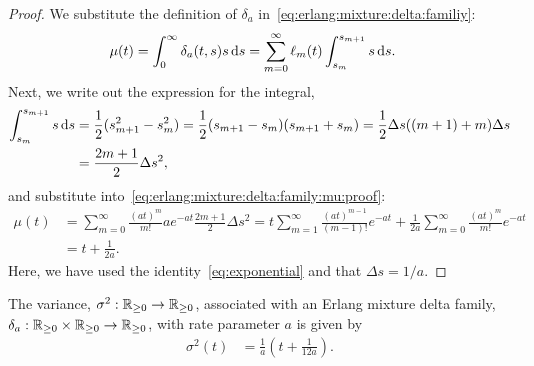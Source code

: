 \begin{proof}
	We substitute the definition of $\delta_a$ in~\eqref{eq:erlang:mixture:delta:familiy}:
	\begin{align}\label{eq:erlang:mixture:delta:family:mu:proof}
		\mu(t)
		&= \int_0^\infty \delta_a(t, s) s \,\mathrm{d} s = \sum_{m=0}^\infty \ell_m(t) \int_{s_m}^{s_{m+1}} s \,\mathrm{d} s.
	\end{align}
	Next, we write out the expression for the integral,
	\begin{align}
		\int_{s_m}^{s_{m+1}} s \,\mathrm{d} s
		&= \frac{1}{2} (s_{m+1}^2 - s_m^2) = \frac{1}{2} (s_{m+1} - s_m)(s_{m+1} + s_m) = \frac{1}{2} \Delta s ((m+1) + m) \Delta s \\
		&= \frac{2m + 1}{2} \Delta s^2, \nonumber
	\end{align}
	and substitute into~\eqref{eq:erlang:mixture:delta:family:mu:proof}:
	\begin{align}
		\mu(t)
		&= \sum_{m=0}^\infty \frac{(at)^m}{m!} a e^{-at} \frac{2m+1}{2} \Delta s^2 = t \sum_{m=1}^\infty \frac{(at)^{m-1}}{(m-1)!} e^{-at} + \frac{1}{2a} \sum_{m=0}^\infty \frac{(at)^m}{m!} e^{-at} \\
		&= t + \frac{1}{2a}. \nonumber
	\end{align}
	Here, we have used the identity~\eqref{eq:exponential} and that $\Delta s = 1/a$.
\end{proof}
%
\begin{lemma}
	The variance, $\sigma^2: \mathbb{R}_{\geq 0} \rightarrow \mathbb{R}_{\geq 0}$, associated with an Erlang mixture delta family, $\delta_a: \mathbb{R}_{\geq 0} \times \mathbb{R}_{\geq 0} \rightarrow \mathbb{R}_{\geq 0}$, with rate parameter $a$ is given by
	\begin{align}
		\sigma^2(t) &= \frac{1}{a} \left(t + \frac{1}{12 a}\right).
	\end{align}
\end{lemma}

